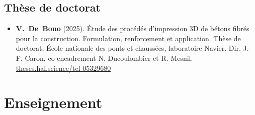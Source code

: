 \documentclass[11pt,a4paper]{article}
\newcommand{\me}{\textbf{V.~De~Bono}}
\newenvironment{publis}[1]%
  {\begin{itemize}[label={}, leftmargin=1.2em, labelwidth=0pt, labelsep=0pt,
     itemindent=-1.2em, itemsep=0.45em, topsep=0.3em]}%
  {\end{itemize}}
\begin{document}
\subsection*{Thèse de doctorat}

\begin{publis}{T}
  \item \me{} (2025).
  Étude des procédés d'impression 3D de bétons fibrés pour la construction. Formulation, renforcement et application.
  Thèse de doctorat, École nationale des ponts et chaussées, laboratoire Navier. Dir. J.-F. Caron, co-encadrement N. Ducoulombier et R. Mesnil.
  \href{https://theses.hal.science/tel-05329680/}{theses.hal.science/tel-05329680}
\end{publis}


\section*{Enseignement}
\end{document}
